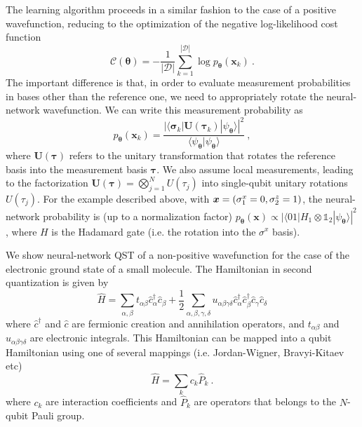 \documentclass[twocolumn,english,reprint,superscriptaddress,longbibliography,pra]{revtex4-1}
\begin{document}
The learning algorithm proceeds in a similar fashion to the case of a positive wavefunction, reducing to the optimization of the negative log-likelihood cost function
\begin{equation}
\mathcal{C}(\bm{\theta})=-\frac{1}{|\mathcal{D}|}\sum_{k=1}^{|\mathcal{D}|}\log p_{\bm{\theta}}(\bm{x}_k)\:.
\end{equation}
The important difference is that, in order to evaluate measurement probabilities in bases other than the reference one, we need to appropriately rotate the neural-network wavefunction. We can write this measurement probability as
\begin{equation}
p_{\bm{\theta}}(\bm{x}_k) = \frac{|\langle\bm{\sigma}_k|\bm{U}(\bm{\tau}_k)|\psi_{\bm\theta}\rangle|^2}{\langle\psi_{\bm\theta}|\psi_{\bm\theta}\rangle}\:,
\end{equation}
where $\bm{U}(\bm{\tau})$ refers to the unitary transformation that rotates the reference basis into the measurement basis $\bm{\tau}$. We also assume local measurements, leading to the factorization $\bm{U}(\bm{\tau})=\bigotimes_{j=1}^NU(\tau_j)$ into single-qubit unitary rotations $U(\tau_j)$. For the example described above, with $\linebreak\bm{x} = (\sigma_1^x=0,\sigma^z_2=1)$, the neural-network probability is (up to a normalization factor) $p_{\bm\theta}(\bm{x})\propto|\langle01|H_1\otimes\mathbb{1}_2|\psi_{\bm\theta}\rangle|^2$, where $H$ is the Hadamard gate (i.e. the rotation into the $\sigma^x$ basis).


We show neural-network QST of a non-positive wavefunction for the case of the electronic ground state of a small molecule. The Hamiltonian in second quantization is given by
\begin{equation}
\hat{H} = \sum_{\alpha,\beta}t_{\alpha\beta}\hat{c}^\dagger_\alpha \hat{c}_\beta + \frac{1}{2}\sum_{\alpha,\beta,\gamma,\delta}u_{\alpha\beta\gamma\delta} \hat{c}^\dagger_\alpha \hat{c}^\dagger_\beta \hat{c}_\gamma \hat{c}_\delta
\end{equation}
where $\hat{c}^\dagger$ and $\hat{c}$ are fermionic creation and annihilation operators, and $t_{\alpha\beta}$ and $u_{\alpha\beta\gamma\delta}$ are electronic integrals. This Hamiltonian can be mapped into a qubit Hamiltonian using one of several mappings (i.e. Jordan-Wigner, Bravyi-Kitaev etc)
\begin{equation}
\hat{H} = \sum_k c_k \hat{P}_k\:.
\end{equation}
where $c_k$ are interaction coefficients and $\hat{P}_k$ are operators that belongs to the $N$-qubit Pauli group. 
\end{document}
